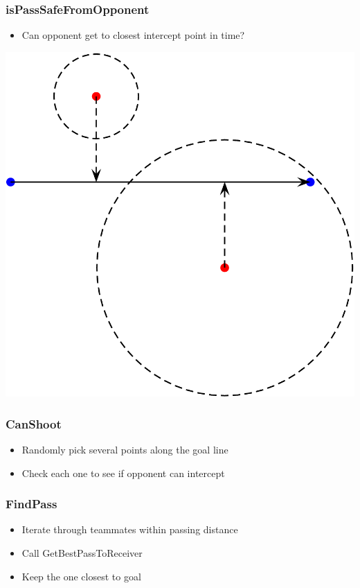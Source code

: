 \documentclass[handout,t,compress]{beamer}
\newcommand{\bframe}[1]{\begin{frame}[fragile]\frametitle{#1}}
\begin{document}
\bframe{isPassSafeFromOpponent}
\begin{itemize}
\item Can opponent get to closest intercept point in time?
\end{itemize}
\includegraphics[scale=0.25]{closest.png}
\end{frame}

\bframe{CanShoot}
\begin{itemize}
\item Randomly pick several points along the goal line
\item Check each one to see if opponent can intercept
\end{itemize}
\end{frame}

\bframe{FindPass}
\begin{itemize}
\item Iterate through teammates within passing distance
\item Call GetBestPassToReceiver
\item Keep the one closest to goal
\end{itemize}
\end{frame}
\end{document}
